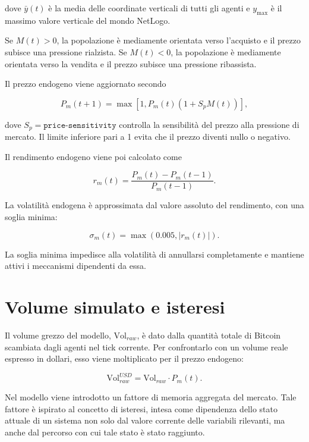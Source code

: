 dove \(\bar{y}(t)\) è la media delle coordinate verticali di tutti gli agenti e
\(y_{\max}\) è il massimo valore verticale del mondo NetLogo.

Se \(M(t)>0\), la popolazione è mediamente orientata verso l'acquisto e il prezzo
subisce una pressione rialzista. Se \(M(t)<0\), la popolazione è mediamente
orientata verso la vendita e il prezzo subisce una pressione ribassista.

Il prezzo endogeno viene aggiornato secondo

\begin{equation}
    P_m(t+1)
    =
    \max
    \left[
    1,
    P_m(t)
    \left(
    1+
    S_p M(t)
    \right)
    \right],
\end{equation}

dove \(S_p=\texttt{price-sensitivity}\) controlla la sensibilità del prezzo alla
pressione di mercato. Il limite inferiore pari a 1 evita che il prezzo diventi
nullo o negativo.

Il rendimento endogeno viene poi calcolato come

\begin{equation}
    r_m(t)
    =
    \frac{P_m(t)-P_m(t-1)}{P_m(t-1)}.
\end{equation}

La volatilità endogena è approssimata dal valore assoluto del rendimento, con una
soglia minima:

\begin{equation}
    \sigma_m(t)
    =
    \max
    \left(
    0.005,
    |r_m(t)|
    \right).
\end{equation}

La soglia minima impedisce alla volatilità di annullarsi completamente e mantiene
attivi i meccanismi dipendenti da essa.

\section{Volume simulato e isteresi}

Il volume grezzo del modello, \(\text{Vol}_{raw}\), è dato dalla quantità totale
di Bitcoin scambiata dagli agenti nel tick corrente. Per confrontarlo con un
volume reale espresso in dollari, esso viene moltiplicato per il prezzo endogeno:

\begin{equation}
    \text{Vol}_{raw}^{USD}
    =
    \text{Vol}_{raw} \cdot P_m(t).
\end{equation}

Nel modello viene introdotto un fattore di memoria aggregata del mercato. Tale
fattore è ispirato al concetto di isteresi, intesa come dipendenza dello stato
attuale di un sistema non solo dal valore corrente delle variabili rilevanti, ma
anche dal percorso con cui tale stato è stato raggiunto.


